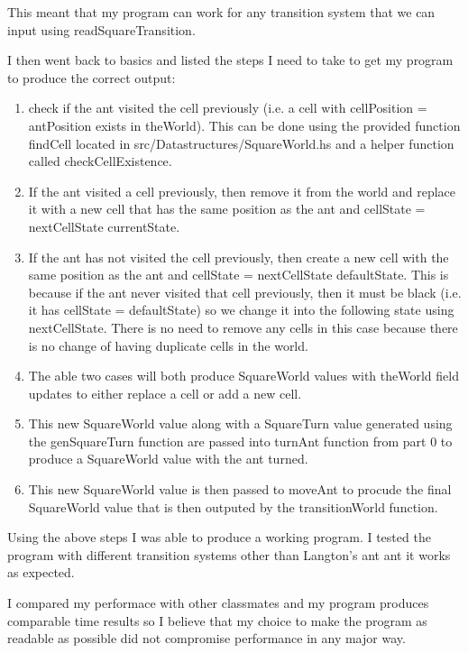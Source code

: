 \documentclass[12pt]{article}
\begin{document}
This meant that my program can work for any transition system that we can input using readSquareTransition.

\break

I then went back to basics and listed the steps I need to take to get my program to produce the correct output:

\begin{enumerate}
\item check if the ant visited the cell previously (i.e. a cell with cellPosition = antPosition exists in theWorld). This can be done using the provided function findCell located in src/Datastructures/SquareWorld.hs and a helper function called checkCellExistence.
\item If the ant visited a cell previously, then remove it from the world and replace it with a new cell that has the same position as the ant and cellState = nextCellState currentState.
\item If the ant has not visited the cell previously, then create a new cell with the same position as the ant and cellState = nextCellState defaultState. This is because if the ant never visited that cell previously, then it must be black (i.e. it has cellState = defaultState) so we change it into the following state using nextCellState. There is no need to remove any cells in this case because there is no change of having duplicate cells in the world.
\item The able two cases will both produce SquareWorld values with theWorld field updates to either replace a cell or add a new cell.
\item This new SquareWorld value along with a SquareTurn value generated using the genSquareTurn function are passed into turnAnt function from part 0 to produce a SquareWorld value with the ant turned.
\item This new SquareWorld value is then passed to moveAnt to procude the final SquareWorld value that is then outputed by the transitionWorld function.
\end{enumerate}

Using the above steps I was able to produce a working program. I tested the program with different transition systems other than Langton's ant ant it works as expected.

I compared my performace with other classmates and my program produces comparable time results so I believe that my choice to make the program as readable as possible did not compromise performance in any major way.
\end{document}
